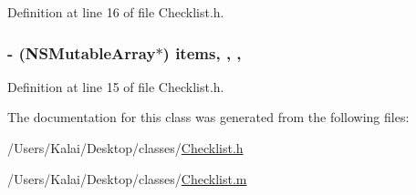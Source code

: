 Definition at line 16 of file Checklist.\-h.

\hypertarget{interface_checklist_a4be406e9e0444c9a3691c8ea776a855a}{
\subsubsection[{items}]{\setlength{\rightskip}{0pt plus 5cm}-\/ (N\-S\-Mutable\-Array$\ast$) items\hspace{0.3cm}{\ttfamily [read]}, {\ttfamily [write]}, {\ttfamily [nonatomic]}, {\ttfamily [strong]}}}\label{interface_checklist_a4be406e9e0444c9a3691c8ea776a855a}


Definition at line 15 of file Checklist.\-h.



The documentation for this class was generated from the following files\-:\begin{DoxyCompactItemize}
\item 
/\-Users/\-Kalai/\-Desktop/classes/\hyperlink{_checklist_8h}{Checklist.\-h}\item 
/\-Users/\-Kalai/\-Desktop/classes/\hyperlink{_checklist_8m}{Checklist.\-m}\end{DoxyCompactItemize}
